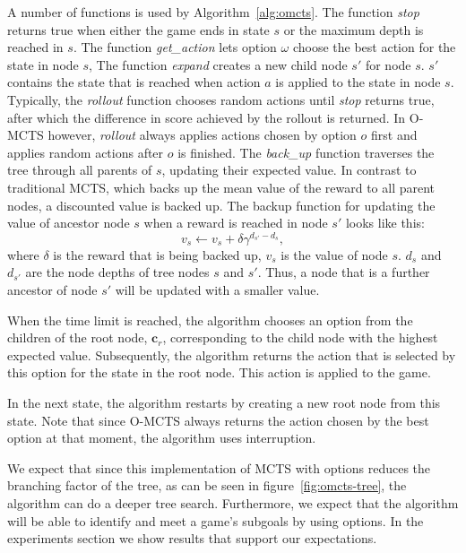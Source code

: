 A number of functions is used by Algorithm~\ref{alg:omcts}. The function
\emph{stop} returns true when either the game ends in state $s$ or the maximum
depth is reached in $s$. The function \emph{get\_action} lets option $\omega$
choose the best action for the state in node $s$, The function \emph{expand}
creates a new child node $s'$ for node $s$. $s'$ contains the state that is
reached when action $a$ is applied to the state in node $s$. Typically, the
\emph{rollout} function chooses random actions until \emph{stop} returns
true, after which the difference in score achieved by the rollout is returned.
In O-MCTS however, \emph{rollout} always applies actions chosen by option $o$
first and applies random actions after $o$ is finished. The \emph{back\_up}
function traverses the tree through all parents of $s$, updating their expected
value. In contrast to traditional MCTS, which backs up the mean value of the
reward to all parent nodes, a discounted value is backed up. The backup function
for updating the value of ancestor node $s$ when a reward is reached in node $s'$
looks like this:
\begin{equation}
	\label{eq:backup}
	v_s \gets v_s + \delta\gamma^{d_{s'}-d_{s}},
\end{equation}
where $\delta$ is the reward that is being backed up, $v_s$ is the value of node
$s$. $d_s$ and $d_{s'}$ are the node depths of tree nodes $s$ and $s'$. Thus, a
node that is a further ancestor of node $s'$ will be updated with a smaller
value.

When the time limit is reached, the algorithm chooses an option from the
children of the root node, $\mathbf{c}_r$, corresponding to the child node with the
highest expected value. Subsequently, the algorithm returns the action that is
selected by this option for the state in the root node. This action is applied
to the game.

In the next state, the algorithm restarts by creating a new root node from
this state. Note that since O-MCTS always returns the action chosen by the best
option at that moment, the algorithm uses interruption.

We expect that since this implementation of MCTS with options reduces the
branching factor of the tree, as can be seen in figure~\ref{fig:omcts-tree}, the
algorithm can do a deeper tree search.  Furthermore, we expect that the
algorithm will be able to identify and meet a game's subgoals by using options.
In the experiments section we show results that support our expectations.
